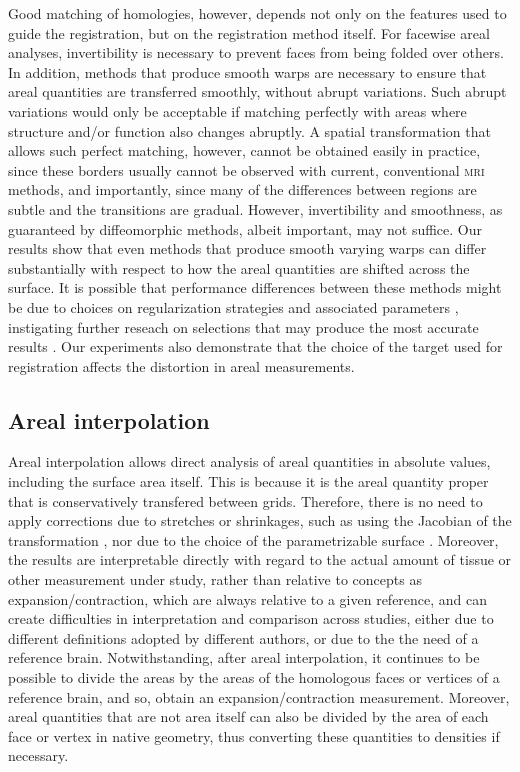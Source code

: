 Good matching of homologies, however, depends not only on the features used to guide the registration, but on the registration method itself. For facewise areal analyses, invertibility is necessary to prevent faces from being folded over others. In addition, methods that produce smooth warps are necessary to ensure that areal quantities are transferred smoothly, without abrupt variations. Such abrupt variations would only be acceptable if matching perfectly with areas where structure and/or function also changes abruptly. A spatial transformation that allows such perfect matching, however, cannot be obtained easily in practice, since these borders usually cannot be observed with current, conventional \textsc{mri} methods, and importantly, since many of the differences between regions are subtle and the transitions are gradual. However, invertibility and smoothness, as guaranteed by diffeomorphic methods, albeit important, may not suffice. Our results show that even methods that produce smooth varying warps can differ substantially with respect to how the areal quantities are shifted across the surface. It is possible that performance differences between these methods might be due to choices on regularization strategies and associated parameters \citep{Fischl1999_intersubject, Yeo2010}, instigating further reseach on selections that may produce the most accurate results \citep{Yeo2010b}. Our experiments also demonstrate that the choice of the target used for registration affects the distortion in areal measurements.

\subsection{Areal interpolation}

Areal interpolation allows direct analysis of areal quantities in absolute values, including the surface area itself. This is because it is the areal quantity proper that is conservatively transfered between grids. Therefore, there is no need to apply corrections due to stretches or shrinkages, such as using the Jacobian of the transformation \citep{Good2001}, nor due to the choice of the parametrizable surface \citep{Thompson1999}. Moreover, the results are interpretable directly with regard to the actual amount of tissue or other measurement under study, rather than relative to concepts as expansion/contraction, which are always relative to a given reference, and can create difficulties in interpretation and comparison across studies, either due to different definitions adopted by different authors, or due to the the need of a reference brain. Notwithstanding, after areal interpolation, it continues to be possible to divide the areas by the areas of the homologous faces or vertices of a reference brain, and so, obtain an expansion/contraction measurement. Moreover, areal quantities that are not area itself can also be divided by the area of each face or vertex in native geometry, thus converting these quantities to densities if necessary.

